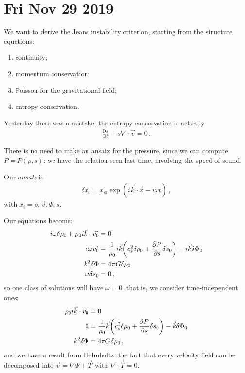 \documentclass[main.tex]{subfiles}
\begin{document}
\section*{Fri Nov 29 2019}

We want to derive the Jeans instability criterion, starting from the structure equations: 
%
\begin{enumerate}
    \item continuity;
    \item momentum conservation;
    \item Poisson for the gravitational field;
    \item entropy conservation. 
\end{enumerate}

Yesterday there was a mistake: the entropy conservation is actually 
%
\begin{align}
  \frac{\mathrm{D} s}{\mathrm{D} t} + s \nabla \cdot \vec{v} = 0 
\,.
\end{align}
%

There is no need to make an ansatz for the pressure, since we can compute \(P = P (\rho ,s )\): we have the relation seen last time, involving the speed of sound. 

Our \emph{ansatz } is 
%
\begin{align}
  \delta x_i = x_{i0} \exp( i \vec{k} \cdot \vec{x} - i \omega t)
\,,
\end{align}
%
with \(x_{i} = \rho, \vec{v}, \Phi , s\). 

Our equations become: 
%
\begin{subequations}
\begin{align}
  i \omega \delta \rho_0 + \rho_0 i \vec{k} \cdot \vec{v_0} &=0  \\
  i \omega \vec{v_0} &= \frac{1}{\rho_0 } i \vec{k}
  \qty(c^2_s \delta \rho_0 + \pdv{P}{s} \delta s_0 ) 
  - i \vec{k} \delta \Phi_0 \\
  k^2 \delta \Phi &= 4 \pi G \delta \rho_0  \\
  \omega \delta s_0 &= 0
\,,
\end{align}
\end{subequations}
%
so one class of solutions will have \(\omega = 0\), that is, we consider time-independent ones: 
%
\begin{subequations}
\begin{align}
  \rho_0 i \vec{k} \cdot \vec{v_0} &=0  \\
  0 &= \frac{1}{\rho_0 }  \vec{k}
  \qty(c^2_s \delta \rho_0 + \pdv{P}{s} \delta s_0 ) 
  - \vec{k} \delta \Phi_0 \\
  k^2 \delta \Phi &= 4 \pi G \delta \rho_0  
\,,
\end{align}
\end{subequations}
%
and we have a result from Helmholtz: the fact that every velocity field can be decomposed into \(\vec{v} = \nabla \Psi + \vec{T}\) with \(\nabla \cdot \vec{T} = 0\). 
\end{document}
